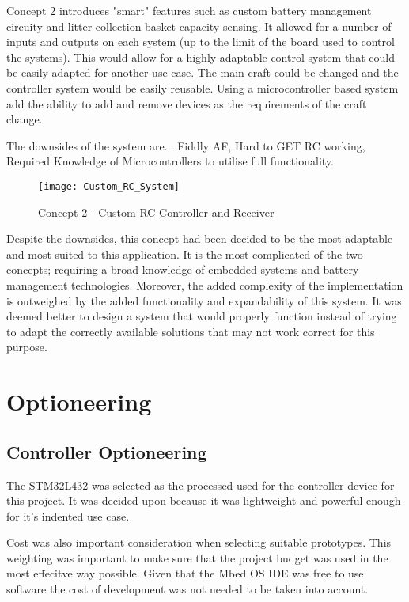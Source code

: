 \documentclass [11pt]{article}
\begin{document}
Concept 2 introduces "smart" features such as custom battery management circuity and litter collection basket capacity sensing. It allowed for a number of inputs and outputs on each system (up to the limit of the board used to control the systems). This would allow for a highly adaptable control system that could be easily adapted for another use-case. The main craft could be changed and the controller system would be easily reusable. Using a microcontroller based system add the ability to add and remove devices as the requirements of the craft change.

The downsides of the system are... Fiddly AF, Hard to GET RC working, Required Knowledge of Microcontrollers to utilise full functionality.  

\begin{figure}[H]
\centerline{\texttt{[image: Custom\_RC\_System]}}
\caption{Concept 2 - Custom RC Controller and Receiver}
\label{fig:Custom_RC_System}
\end{figure} 

Despite the downsides, this concept had been decided to be the most adaptable and most suited to this application. It is the most complicated of the two concepts; requiring a broad knowledge of embedded systems and battery management technologies. Moreover, the added complexity of the implementation is outweighed by the added functionality and expandability of this system. It was deemed better to design a system that would properly function instead of trying to adapt the correctly available solutions that may not work correct for this purpose.

\section{Optioneering}
\subsection{Controller Optioneering}

The STM32L432 was selected as the processed used for the controller device for this project. It was decided upon because it was lightweight and powerful enough for it's indented use case. 
 
Cost was also important consideration when selecting suitable prototypes. This weighting was important to make sure that the project budget was used in the most effecitve way possible. Given that the Mbed OS IDE was free to use software the cost of development was not needed to be taken into account. 
\end{document}
